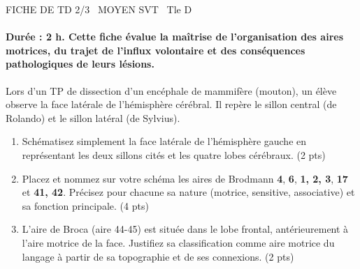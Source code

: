 \documentclass[11pt]{article}
\begin{document}
\begin{tcolorbox}[enhanced,colback=popink,colframe=popink,arc=10pt,boxrule=0pt,left=12pt,right=12pt,top=9pt,bottom=9pt]
{\color{white}\popxbold\small FICHE DE TD 2/3 \textbullet\ MOYEN \hfill SVT \textbullet\ Tle D\par}
\end{tcolorbox}
\vspace{4pt}
\paragraph{Durée : 2 h. Cette fiche évalue la maîtrise de l'organisation des aires motrices, du trajet de l'influx volontaire et des conséquences pathologiques de leurs lésions.}

\begin{exercice}
Lors d'un TP de dissection d'un encéphale de mammifère (mouton), un élève observe la face latérale de l'hémisphère cérébral. Il repère le sillon central (de Rolando) et le sillon latéral (de Sylvius).
\begin{enumerate}
    \item Schématisez simplement la face latérale de l'hémisphère gauche en représentant les deux sillons cités et les quatre lobes cérébraux. (2 pts)
    \item Placez et nommez sur votre schéma les aires de Brodmann \textbf{4}, \textbf{6}, \textbf{1, 2, 3}, \textbf{17} et \textbf{41, 42}. Précisez pour chacune sa nature (motrice, sensitive, associative) et sa fonction principale. (4 pts)
    \item L'aire de Broca (aire 44-45) est située dans le lobe frontal, antérieurement à l'aire motrice de la face. Justifiez sa classification comme aire motrice du langage à partir de sa topographie et de ses connexions. (2 pts)
\end{enumerate}
\end{exercice}
\end{document}
